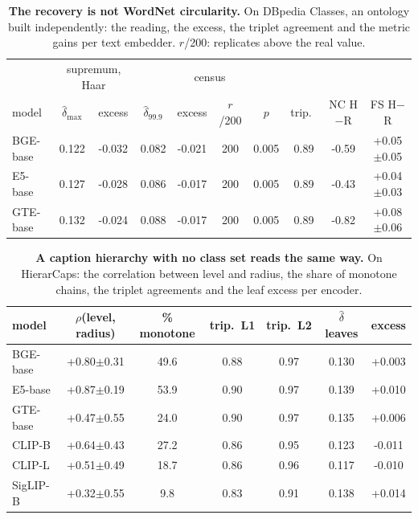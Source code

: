 \begin{table}[H]
\centering
\scriptsize
\setlength{\tabcolsep}{2.6pt}
\begingroup
\setlength{\tabcolsep}{2.5pt}
\begin{tabular}{lcc|cccc|ccc}
\toprule
 & \multicolumn{2}{c|}{supremum, Haar} & \multicolumn{4}{c|}{census} & & & \\
model & $\hat\delta_{\max}$ & excess & $\hat\delta_{99.9}$ & excess & $r$/200 & $p$ & trip.\ & NC H$-$R & FS H$-$R \\
\midrule
BGE-base & 0.122 & -0.032 & 0.082 & -0.021 & 200 & 0.005 & 0.89 & -0.59 & +0.05$\pm$0.05 \\
E5-base & 0.127 & -0.028 & 0.086 & -0.017 & 200 & 0.005 & 0.89 & -0.43 & +0.04$\pm$0.03 \\
GTE-base & 0.132 & -0.024 & 0.088 & -0.017 & 200 & 0.005 & 0.89 & -0.82 & +0.08$\pm$0.06 \\
\bottomrule
\end{tabular}
\par\vspace{2pt}
\endgroup
\caption{\textbf{The recovery is not WordNet circularity.} On DBpedia Classes, an ontology built independently: the reading, the excess, the triplet agreement and the metric gains per text embedder. $r$/200: replicates above the real value.
}
\label{tab:q7-wordnet-c}
\end{table}
\begin{table}[H]
\centering
\scriptsize
\setlength{\tabcolsep}{2.6pt}
\begingroup
\footnotesize
\setlength{\tabcolsep}{4pt}
\begin{tabular}{lcccccc}
\toprule
model & $\rho$(level, radius) & \% monotone & trip.\ L1 & trip.\ L2 & $\hat\delta$ leaves & excess \\
\midrule
BGE-base & +0.80$\pm$0.31 & 49.6 & 0.88 & 0.97 & 0.130 & +0.003 \\
E5-base & +0.87$\pm$0.19 & 53.9 & 0.90 & 0.97 & 0.139 & +0.010 \\
GTE-base & +0.47$\pm$0.55 & 24.0 & 0.90 & 0.97 & 0.135 & +0.006 \\
CLIP-B & +0.64$\pm$0.43 & 27.2 & 0.86 & 0.95 & 0.123 & -0.011 \\
CLIP-L & +0.51$\pm$0.49 & 18.7 & 0.86 & 0.96 & 0.117 & -0.010 \\
SigLIP-B & +0.32$\pm$0.55 & 9.8 & 0.83 & 0.91 & 0.138 & +0.014 \\
\bottomrule
\end{tabular}
\par\vspace{2pt}
\endgroup
\caption{\textbf{A caption hierarchy with no class set reads the same way.} On HierarCaps: the correlation between level and radius, the share of monotone chains, the triplet agreements and the leaf excess per encoder.
}
\label{tab:q7-wordnet-d}
\end{table}

